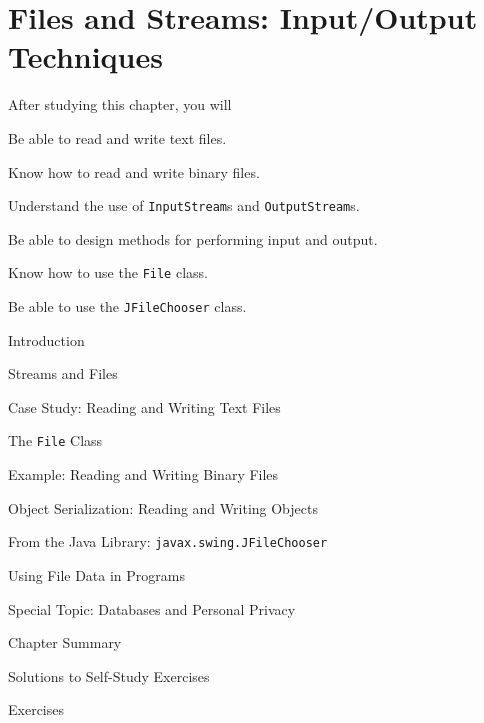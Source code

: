 \setcounter{SSTUDYcount}{1}
\setcounter{chapter}{10}
\chapter{Files and Streams: Input/Output Techniques}
\label{chapter-files}


\CObegin


\noindent After studying this chapter, you will

\begin{COBL}
\item  Be able to read and write text files.
\item  Know how to read and write binary files.
\item  Understand the  use of {\tt InputStream}s and {\tt OutputStream}s.
\item  Be able to design methods for performing
 input and output.
\item  Know how to use the {\tt File} class.
\item  Be able to use the {\tt JFileChooser} class.
\end{COBL}


\begin{COL}
\item {Introduction}
\item {Streams and Files}
\item {Case Study: Reading and Writing Text Files}
\item {The {\tt File} Class}
\item {Example: Reading and Writing Binary Files}
\item {Object Serialization: Reading and Writing Objects}
\item {From the Java Library: {\tt javax.swing.JFileChooser}}
\item {Using File Data in Programs}    %
\item[] {\color{cyan}Special Topic: Databases and Personal Privacy}
\par\small\item[] {Chapter Summary}
\par\small\item[] {Solutions to Self-Study Exercises}
\par\small\item[] {Exercises}
\end{COL}
\COend

